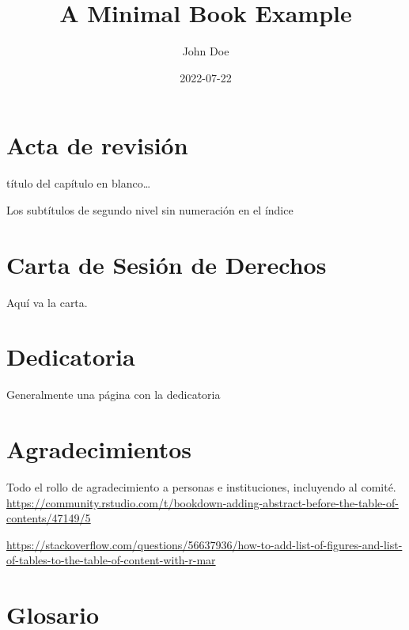 \documentclass[
  12pt,
  twoside]{book}
\title{A Minimal Book Example}
\author{John Doe}
\date{2022-07-22}
\theoremstyle{definition}
\theoremstyle{definition}
\theoremstyle{definition}
\theoremstyle{definition}
\theoremstyle{remark}
\begin{document}
\maketitle

\hypertarget{acta-de-revisiuxf3n}{%
\chapter*{Acta de revisión}\label{acta-de-revisiuxf3n}}

título del capítulo en blanco\ldots{}

Los subtítulos de segundo nivel sin numeración en el índice

\hypertarget{carta-de-sesiuxf3n-de-derechos}{%
\chapter*{Carta de Sesión de Derechos}\label{carta-de-sesiuxf3n-de-derechos}}

Aquí va la carta.

\newpage

\hypertarget{dedicatoria}{%
\chapter*{Dedicatoria}\label{dedicatoria}}

Generalmente una página con la dedicatoria

\newpage

\hypertarget{agradecimientos}{%
\chapter*{Agradecimientos}\label{agradecimientos}}

Todo el rollo de agradecimiento a personas e instituciones, incluyendo al comité.
\url{https://community.rstudio.com/t/bookdown-adding-abstract-before-the-table-of-contents/47149/5}

\url{https://stackoverflow.com/questions/56637936/how-to-add-list-of-figures-and-list-of-tables-to-the-table-of-content-with-r-mar}

\newpage

\tableofcontents
\listoffigures
\listoftables

\newpage

\hypertarget{glosario}{%
\chapter*{Glosario}\label{glosario}}
\end{document}
